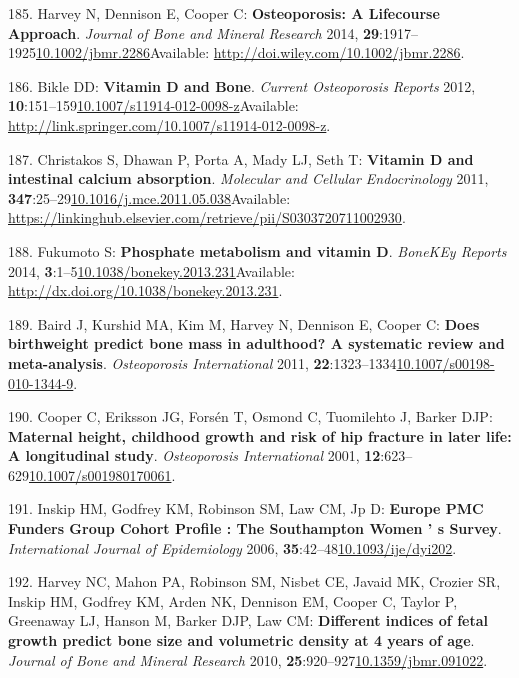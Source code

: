 \documentclass[
]{book}
\begin{document}
\leavevmode\hypertarget{ref-Harvey2014b}{}%
185. Harvey N, Dennison E, Cooper C: \textbf{Osteoporosis: A Lifecourse Approach}. \emph{Journal of Bone and Mineral Research} 2014, \textbf{29}:1917--1925\href{https://doi.org/10.1002/jbmr.2286}{10.1002/jbmr.2286}Available: \url{http://doi.wiley.com/10.1002/jbmr.2286}.

\leavevmode\hypertarget{ref-Bikle2012}{}%
186. Bikle DD: \textbf{Vitamin D and Bone}. \emph{Current Osteoporosis Reports} 2012, \textbf{10}:151--159\href{https://doi.org/10.1007/s11914-012-0098-z}{10.1007/s11914-012-0098-z}Available: \url{http://link.springer.com/10.1007/s11914-012-0098-z}.

\leavevmode\hypertarget{ref-Christakos2011}{}%
187. Christakos S, Dhawan P, Porta A, Mady LJ, Seth T: \textbf{Vitamin D and intestinal calcium absorption}. \emph{Molecular and Cellular Endocrinology} 2011, \textbf{347}:25--29\href{https://doi.org/10.1016/j.mce.2011.05.038}{10.1016/j.mce.2011.05.038}Available: \url{https://linkinghub.elsevier.com/retrieve/pii/S0303720711002930}.

\leavevmode\hypertarget{ref-Fukumoto2014}{}%
188. Fukumoto S: \textbf{Phosphate metabolism and vitamin D}. \emph{BoneKEy Reports} 2014, \textbf{3}:1--5\href{https://doi.org/10.1038/bonekey.2013.231}{10.1038/bonekey.2013.231}Available: \url{http://dx.doi.org/10.1038/bonekey.2013.231}.

\leavevmode\hypertarget{ref-Baird2011}{}%
189. Baird J, Kurshid MA, Kim M, Harvey N, Dennison E, Cooper C: \textbf{Does birthweight predict bone mass in adulthood? A systematic review and meta-analysis}. \emph{Osteoporosis International} 2011, \textbf{22}:1323--1334\href{https://doi.org/10.1007/s00198-010-1344-9}{10.1007/s00198-010-1344-9}.

\leavevmode\hypertarget{ref-Cooper2001}{}%
190. Cooper C, Eriksson JG, Forsén T, Osmond C, Tuomilehto J, Barker DJP: \textbf{Maternal height, childhood growth and risk of hip fracture in later life: A longitudinal study}. \emph{Osteoporosis International} 2001, \textbf{12}:623--629\href{https://doi.org/10.1007/s001980170061}{10.1007/s001980170061}.

\leavevmode\hypertarget{ref-Inskip2006}{}%
191. Inskip HM, Godfrey KM, Robinson SM, Law CM, Jp D: \textbf{Europe PMC Funders Group Cohort Profile : The Southampton Women ' s Survey}. \emph{International Journal of Epidemiology} 2006, \textbf{35}:42--48\href{https://doi.org/10.1093/ije/dyi202}{10.1093/ije/dyi202}.

\leavevmode\hypertarget{ref-Harvey2010a}{}%
192. Harvey NC, Mahon PA, Robinson SM, Nisbet CE, Javaid MK, Crozier SR, Inskip HM, Godfrey KM, Arden NK, Dennison EM, Cooper C, Taylor P, Greenaway LJ, Hanson M, Barker DJP, Law CM: \textbf{Different indices of fetal growth predict bone size and volumetric density at 4 years of age}. \emph{Journal of Bone and Mineral Research} 2010, \textbf{25}:920--927\href{https://doi.org/10.1359/jbmr.091022}{10.1359/jbmr.091022}.
\end{document}
